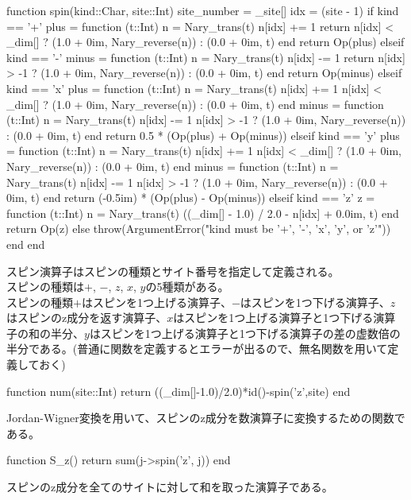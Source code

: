 \documentclass{ltjsarticle}
\begin{document}
\begin{jllisting}
function spin(kind::Char, site::Int)
  site_number = _site[]
  idx = (site - 1) %
  if kind == '+'
    plus = function (t::Int)
      n = Nary_trans(t)
      n[idx] += 1
      return n[idx] < _dim[] ? (1.0 + 0im, Nary_reverse(n)) : (0.0 + 0im, t)
    end
    return Op(plus)
  elseif kind == '-'
    minus = function (t::Int)
      n = Nary_trans(t)
      n[idx] -= 1
      return n[idx] > -1 ? (1.0 + 0im, Nary_reverse(n)) : (0.0 + 0im, t)
    end
    return Op(minus)
  elseif kind == 'x'
    plus = function (t::Int)
      n = Nary_trans(t)
      n[idx] += 1
      n[idx] < _dim[] ? (1.0 + 0im, Nary_reverse(n)) : (0.0 + 0im, t)
    end
    minus = function (t::Int)
      n = Nary_trans(t)
      n[idx] -= 1
      n[idx] > -1 ? (1.0 + 0im, Nary_reverse(n)) : (0.0 + 0im, t)
    end
    return 0.5 * (Op(plus) + Op(minus))
  elseif kind == 'y'
    plus = function (t::Int)
      n = Nary_trans(t)
      n[idx] += 1
      n[idx] < _dim[] ? (1.0 + 0im, Nary_reverse(n)) : (0.0 + 0im, t)
    end
    minus = function (t::Int)
      n = Nary_trans(t)
      n[idx] -= 1
      n[idx] > -1 ? (1.0 + 0im, Nary_reverse(n)) : (0.0 + 0im, t)
    end
    return (-0.5im) * (Op(plus) - Op(minus))
  elseif kind == 'z'
    z = function (t::Int)
      n = Nary_trans(t)
      ((_dim[] - 1.0) / 2.0 - n[idx] + 0.0im, t)
    end
    return Op(z)
  else
    throw(ArgumentError("kind must be '+', '-', 'x', 'y', or 'z'"))
  end
end
\end{jllisting}
スピン演算子はスピンの種類とサイト番号を指定して定義される。\\
スピンの種類は$+$, $-$, $z$, $x$, $y$の5種類がある。\\
スピンの種類$+$はスピンを1つ上げる演算子、$-$はスピンを1つ下げる演算子、$z$はスピンのz成分を返す演算子、$x$はスピンを1つ上げる演算子と1つ下げる演算子の和の半分、$y$はスピンを1つ上げる演算子と1つ下げる演算子の差の虚数倍の半分である。(普通に関数を定義するとエラーが出るので、無名関数を用いて定義しておく)\\
\begin{jllisting}
function num(site::Int)
  return ((_dim[]-1.0)/2.0)*id()-spin('z',site)
end
\end{jllisting}
Jordan-Wigner変換を用いて、スピンのz成分を数演算子に変換するための関数である。\\
\begin{jllisting}
function S_z()
  return sum(j->spin('z', j))
end
\end{jllisting}
スピンのz成分を全てのサイトに対して和を取った演算子である。\\
\end{document}
